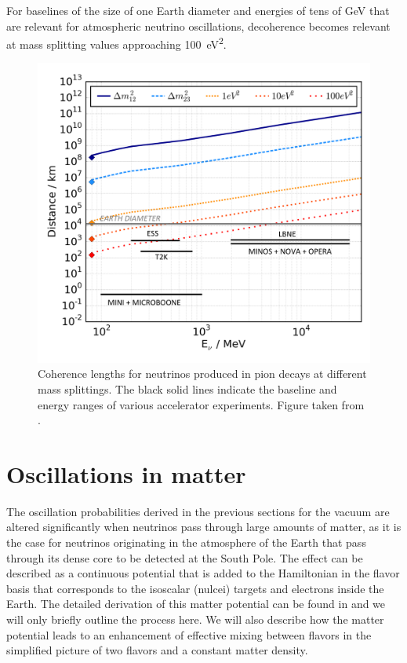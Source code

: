 For baselines of the size of one Earth diameter and energies of tens of GeV that are relevant for atmospheric neutrino oscillations, decoherence becomes relevant at mass splitting values approaching \SI{100}{\electronvolt\squared}.
\begin{figure}
    \centering
    \includegraphics[width=0.7\linewidth]{figures/theory/VariousPionBeams.pdf}
    \caption{Coherence lengths for neutrinos produced in pion decays at different mass splittings. The black solid lines indicate the baseline and energy ranges of various accelerator experiments. Figure taken from \cite{atmo_decoherence}.\label{fig:decoh-jones}}
\end{figure}

\section{Oscillations in matter}
\label{sec:matter-oscillations}
The oscillation probabilities derived in the previous sections for the vacuum are altered significantly when neutrinos pass through large amounts of matter, as it is the case for neutrinos originating in the atmosphere of the Earth that pass through its dense core to be detected at the South Pole.
The effect can be described as a continuous potential that is added to the Hamiltonian in the flavor basis that corresponds to the isoscalar (nulcei) targets and electrons inside the Earth.
The detailed derivation of this matter potential can be found in  and we will only briefly outline the process here.
We will also describe how the matter potential leads to an enhancement of effective mixing between flavors in the simplified picture of two flavors and a constant matter density.


